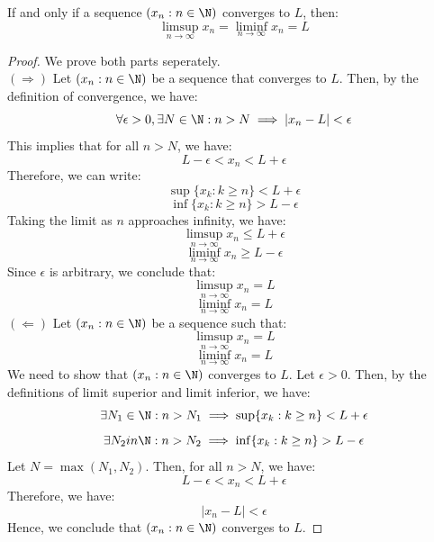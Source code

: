 \documentclass[openany]{book}
\begin{document}
\begin{mytheorem}
    If and only if a sequence $(x_n : n \in \N)$ converges to $L$, then:
    $$\limsup_{n \to \infty} x_n = \liminf_{n \to \infty} x_n = L$$
\end{mytheorem}
\begin{proof}
    We prove both parts seperately. \\
    $(\Rightarrow)$ Let $(x_n : n \in \N)$ be a sequence that converges to $L$. Then, by the definition of convergence, we have:
    $$\forall \epsilon > 0, \exists N \in \N: n > N \implies |x_n - L| < \epsilon$$
    This implies that for all $n > N$, we have:
    $$L - \epsilon < x_n < L + \epsilon$$
    Therefore, we can write:
    $$\sup\{x_k : k \geq n\} < L + \epsilon$$
    $$\inf\{x_k : k \geq n\} > L - \epsilon$$
    Taking the limit as $n$ approaches infinity, we have:
    $$\limsup_{n \to \infty} x_n \leq L + \epsilon$$
    $$\liminf_{n \to \infty} x_n \geq L - \epsilon$$
    Since $\epsilon$ is arbitrary, we conclude that:
    $$\limsup_{n \to \infty} x_n = L$$
    $$\liminf_{n \to \infty} x_n = L$$
    $(\Leftarrow)$ Let $(x_n : n \in \N)$ be a sequence such that:
    $$\limsup_{n \to \infty} x_n = L$$
    $$\liminf_{n \to \infty} x_n = L$$
    We need to show that $(x_n : n \in \N)$ converges to $L$. Let $\epsilon > 0$. Then, by the definitions of limit superior and limit inferior, we have:
    $$\exists N_1 \in \N: n > N_1 \implies \sup\{x_k : k \geq n\} < L + \epsilon$$
    $$\exists N_2 in \N: n > N_2 \implies \inf\{x_k : k \geq n\} > L - \epsilon$$
    Let $N = \max(N_1, N_2)$. Then, for all $n > N$, we have:
    $$L - \epsilon < x_n < L + \epsilon$$
    Therefore, we have:
    $$|x_n - L| < \epsilon$$
    Hence, we conclude that $(x_n : n \in \N)$ converges to $L$.
\end{proof}
\end{document}
